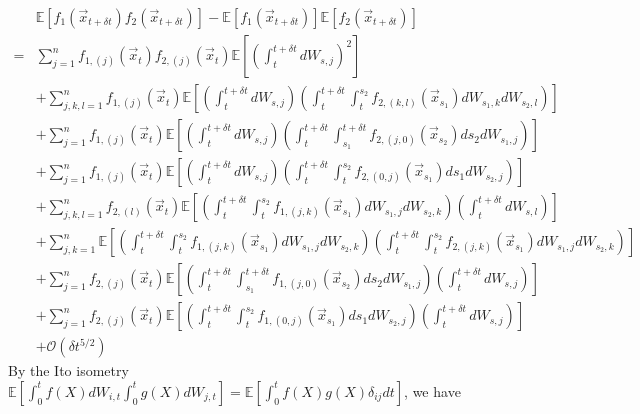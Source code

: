 \documentclass[12pt]{article}
\begin{document}
\begin{equation}
\begin{aligned}
&\mathbb{E} \left[ f_1(\vec{x}_{t + \delta t}) f_2(\vec{x}_{t + \delta t}) \right] 
- \mathbb{E} \left[ f_1(\vec{x}_{t + \delta t}) \right] \mathbb{E} \left[ f_2(\vec{x}_{t + \delta t}) \right] \\
=& 
 \sum_{j=1}^n f_{1,(j)}(\vec{x}_t) f_{2,(j)}(\vec{x}_t) \mathbb{E} \left[ \left( \int_t^{t + \delta t} dW_{s,j} \right)^2 \right] \\
&+ \sum_{j,k,l=1}^n f_{1,(j)}(\vec{x}_t) \mathbb{E} \left[ \left( \int_t^{t + \delta t} dW_{s,j} \right) \left( \int_t^{t+\delta t} \int_t^{s_2} f_{2,(k,l)}(\vec{x}_{s_1}) dW_{s_1, k} dW_{s_2, l} \right) \right] \\
&+ \sum_{j=1}^n f_{1,(j)}(\vec{x}_t) \mathbb{E} \left[ \left( \int_t^{t + \delta t} dW_{s,j} \right)\left( \int_t^{t+\delta t} \int_{s_1}^{t+\delta t} f_{2,(j,0)}(\vec{x}_{s_2}) ds_2 dW_{s_1, j}  \right) \right]\\
&+ \sum_{j=1}^n f_{1,(j)}(\vec{x}_t) \mathbb{E} \left[ \left( \int_t^{t + \delta t} dW_{s,j} \right) \left( \int_t^{t+\delta t} \int_t^{s_2} f_{2,(0,j)}(\vec{x}_{s_1}) ds_1 dW_{s_2, j} \right) \right] \\
&+  \sum_{j, k, l=1}^n  f_{2,(l)}(\vec{x}_t)\mathbb{E} \left[ \left( \int_t^{t+\delta t} \int_t^{s_2} f_{1,(j,k)}(\vec{x}_{s_1}) dW_{s_1, j} dW_{s_2, k} \right) \left( \int_t^{t + \delta t} dW_{s,l} \right) \right] \\
&+ \sum_{j, k=1}^n \mathbb{E} \left[ \left( \int_t^{t+\delta t} \int_t^{s_2} f_{1,(j,k)}(\vec{x}_{s_1}) dW_{s_1, j} dW_{s_2, k} \right) \left( \int_t^{t+\delta t} \int_t^{s_2} f_{2,(j,k)}(\vec{x}_{s_1}) dW_{s_1, j} dW_{s_2,k} \right) \right] \\
&+  \sum_{j=1}^n f_{2,(j)}(\vec{x}_t) \mathbb{E} \left[ \left( \int_t^{t+\delta t} \int_{s_1}^{t + \delta t} f_{1,(j,0)}(\vec{x}_{s_2}) ds_2 dW_{s_1, j}   \right) \left( \int_t^{t + \delta t} dW_{s,j} \right) \right]\\
&+   \sum_{j=1}^n  f_{2,(j)}(\vec{x}_t) \mathbb{E} \left[ \left( \int_t^{t+\delta t} \int_t^{s_2} f_{1,(0,j)}(\vec{x}_{s_1}) ds_1 dW_{s_2, j}  \right) \left(\int_t^{t + \delta t} dW_{s,j} \right) \right] \\
&+ \mathcal{O} (\delta t^{5/2})
\end{aligned}
\end{equation}
%
By the Ito isometry $\mathbb{E} \left[ \int_0^t f(X) dW_{i,t} \int_0^t g(X) dW_{j,t} \right] = \mathbb{E} \left[ \int_0^t f(X) g(X) \delta_{ij} dt \right]$, we have
\end{document}

